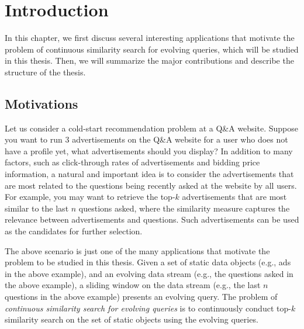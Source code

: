 
%
%

\chapter{Introduction}

In this chapter, we first discuss several interesting applications that motivate the problem of continuous similarity search for evolving queries, which will be studied in this thesis.  Then, we will summarize the major contributions and describe the structure of the thesis.

\section{Motivations}

Let us consider a cold-start recommendation problem at a Q\&A website.  Suppose you want to run $3$ advertisements on the Q\&A website for a user who does not have a profile yet, what advertisements should you display?  In addition to many factors, such as click-through rates of advertisements and bidding price information, a natural and important idea is to consider the advertisements  that are most related to the questions being recently asked at the website by all users.  For example, you may want to retrieve the top-$k$ advertisements that are most similar to the last $n$ questions asked, where the similarity measure captures the relevance between advertisements and questions.  Such advertisements can be used as the candidates for further selection. 

The above scenario is just one of the many applications that motivate the problem to be studied in this thesis.  Given a set of static data objects (e.g., ads in the above example), and an evolving data stream (e.g., the questions asked in the above example), a sliding window on the data stream (e.g., the last $n$ questions in the above example) presents an evolving query.  The problem of \emph{continuous similarity search for evolving queries} is to continuously conduct top-$k$ similarity search on the set of static objects using the evolving queries.  

